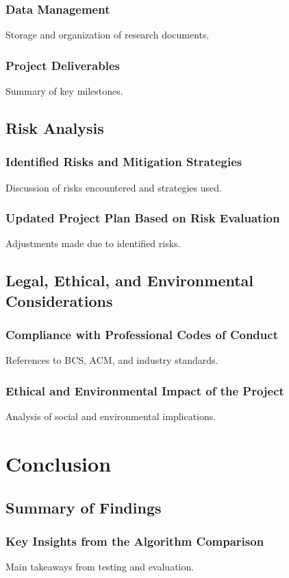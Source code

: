 \documentclass[a4paper,11pt]{report}
\begin{document}
\subsection{Data Management}
Storage and organization of research documents.

\subsection{Project Deliverables}
Summary of key milestones.

\section{Risk Analysis}
\subsection{Identified Risks and Mitigation Strategies}
Discussion of risks encountered and strategies used.

\subsection{Updated Project Plan Based on Risk Evaluation}
Adjustments made due to identified risks.

\section{Legal, Ethical, and Environmental Considerations}
\subsection{Compliance with Professional Codes of Conduct}
References to BCS, ACM, and industry standards.

\subsection{Ethical and Environmental Impact of the Project}
Analysis of social and environmental implications.

\newpage

\chapter{Conclusion}
\section{Summary of Findings}
\subsection{Key Insights from the Algorithm Comparison}
Main takeaways from testing and evaluation.
\end{document}
